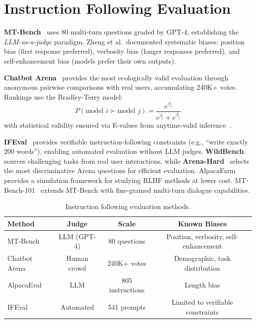 \documentclass[11pt]{article}
\begin{document}
\section{Instruction Following Evaluation}
\label{sec:instruction}

\textbf{MT-Bench}~\cite{zheng2023judging} uses 80 multi-turn questions graded by GPT-4, establishing the \emph{LLM-as-a-judge} paradigm. Zheng et al.\ documented systematic biases: position bias (first response preferred), verbosity bias (longer responses preferred), and self-enhancement bias (models prefer their own outputs).

\textbf{Chatbot Arena}~\cite{chiang2024chatbot} provides the most ecologically valid evaluation through anonymous pairwise comparisons with real users, accumulating 240K+ votes. Rankings use the Bradley-Terry model:
\begin{equation}
P(\text{model } i \succ \text{model } j) = \frac{e^{\beta_i}}{e^{\beta_i} + e^{\beta_j}}
\label{eq:bt}
\end{equation}
with statistical validity ensured via E-values from anytime-valid inference~\cite{vovk2021evalues}.

\textbf{IFEval}~\cite{zhou2023ifeval} provides verifiable instruction-following constraints (e.g., ``write exactly 200 words''), enabling automated evaluation without LLM judges. \textbf{WildBench}~\cite{lin2024wildbench} sources challenging tasks from real user interactions, while \textbf{Arena-Hard}~\cite{li2024arenahard} selects the most discriminative Arena questions for efficient evaluation. AlpacaFarm~\cite{dubois2024alpacafarm} provides a simulation framework for studying RLHF methods at lower cost. MT-Bench-101~\cite{bai2024mt} extends MT-Bench with fine-grained multi-turn dialogue capabilities.

\begin{table}[h]
\centering
\caption{Instruction following evaluation methods.}
\small
\begin{tabular}{@{}lccc@{}}
\toprule
\textbf{Method} & \textbf{Judge} & \textbf{Scale} & \textbf{Known Biases} \\
\midrule
MT-Bench & LLM (GPT-4) & 80 questions & Position, verbosity, self-enhancement \\
Chatbot Arena & Human crowd & 240K+ votes & Demographic, task distribution \\
AlpacaEval & LLM & 805 instructions & Length bias \\
IFEval & Automated & 541 prompts & Limited to verifiable constraints \\
\bottomrule
\end{tabular}
\end{table}
\end{document}
